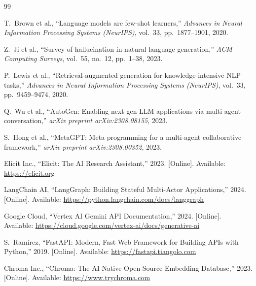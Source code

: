 \documentclass[12pt, a4paper]{article}
\begin{document}
\begin{thebibliography}{99}

T.\ Brown et al., ``Language models are few-shot learners,''
\textit{Advances in Neural Information Processing Systems (NeurIPS)}, vol.~33,
pp.~1877--1901, 2020.

Z.\ Ji et al., ``Survey of hallucination in natural language generation,''
\textit{ACM Computing Surveys}, vol.~55, no.~12, pp.~1--38, 2023.

P.\ Lewis et al., ``Retrieval-augmented generation for knowledge-intensive NLP tasks,''
\textit{Advances in Neural Information Processing Systems (NeurIPS)}, vol.~33,
pp.~9459--9474, 2020.

Q.\ Wu et al., ``AutoGen: Enabling next-gen LLM applications via multi-agent conversation,''
\textit{arXiv preprint arXiv:2308.08155}, 2023.

S.\ Hong et al., ``MetaGPT: Meta programming for a multi-agent collaborative framework,''
\textit{arXiv preprint arXiv:2308.00352}, 2023.

Elicit Inc., ``Elicit: The AI Research Assistant,'' 2023.
[Online]. Available: \url{https://elicit.org}

LangChain AI, ``LangGraph: Building Stateful Multi-Actor Applications,'' 2024.
[Online]. Available: \url{https://python.langchain.com/docs/langgraph}

Google Cloud, ``Vertex AI Gemini API Documentation,'' 2024.
[Online]. Available: \url{https://cloud.google.com/vertex-ai/docs/generative-ai}

S.\ Ram\'{i}rez, ``FastAPI: Modern, Fast Web Framework for Building APIs with Python,''
2019. [Online]. Available: \url{https://fastapi.tiangolo.com}

Chroma Inc., ``Chroma: The AI-Native Open-Source Embedding Database,'' 2023.
[Online]. Available: \url{https://www.trychroma.com}

\end{thebibliography}

\newpage

\end{document}
